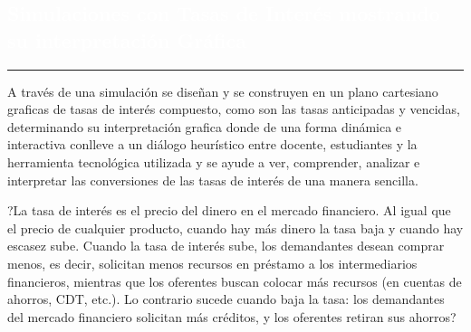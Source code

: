 \begin{titlepage}
\pagecolor{white}
\newcommand{\R}{\ensuremath{\mathbb{R}}}
\BgThispage
{}
\vspace*{-1.1cm}
\noindent
\def\titulo#1{\section{#1}}

\section{\bf\large\textcolor{white}{Simulaciones con Tasas de Inter\'es mostrando su interpretaci\'on Gr\'afica}}
\vspace*{2cm}\par
\noindent

\begin{minipage}{0.5\linewidth}
\begin{minipage}{0.45\linewidth}
    \begin{flushright}
        \printauthor
    \end{flushright}
\end{minipage} \hspace{-3pt}
%
\begin{minipage}{0.02\linewidth}
   \color{ptctitle} \rule{1pt}{245pt}
\end{minipage} 
\end{minipage}
\hspace*{-4.5cm}
\begin{minipage}{0.85\linewidth}
\begin{minipage}{0.85\linewidth}
\footnotesize
\vspace{5pt}
    \begin{resumen}
    
A trav\'es de una simulaci\'on se dise\~nan y se construyen en un plano cartesiano graficas de tasas de inter\'es compuesto, como son las tasas anticipadas y vencidas, determinando su interpretaci\'on grafica donde de una forma din\'amica e interactiva conlleve a un di\'alogo heur\'istico entre docente, estudiantes y la herramienta tecnol\'ogica utilizada y se ayude a ver, comprender, analizar e interpretar las conversiones de las tasas de inter\'es de una manera sencilla. 

?La tasa de inter\'es es el precio del dinero en el mercado financiero. Al igual que el precio de cualquier producto, cuando hay m\'as dinero la tasa baja y cuando hay escasez sube.  Cuando la tasa de inter\'es sube, los demandantes desean comprar menos, es decir, solicitan menos recursos en pr\'estamo a los intermediarios financieros, mientras que los oferentes buscan colocar m\'as recursos (en cuentas de ahorros, CDT, etc.). Lo contrario sucede cuando baja la tasa: los demandantes del mercado financiero solicitan m\'as cr\'editos, y los oferentes retiran sus ahorros?  


\end{resumen}
\end{minipage}
\end{minipage}
\end{titlepage}
